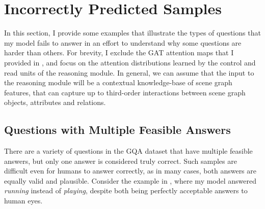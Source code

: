 \section{Incorrectly Predicted Samples}

In this section, I provide some examples that illustrate the types of questions that my model fails to answer in an effort to understand why some questions are harder than others. For brevity, I exclude the GAT attention maps that I provided in  \subsectionautorefname{ \ref{subsection:discussion_logical_sample}}, and focus on the attention distributions learned by the control and read units of the reasoning module. In general, we can assume that the input to the reasoning module will be a contextual knowledge-base of scene graph features, that can capture up to third-order interactions between scene graph objects, attributes and relations.

\subsection{Questions with Multiple Feasible Answers}

There are a variety of questions in the GQA dataset that have multiple feasible answers, but only one answer is considered truly correct. Such samples are difficult even for humans to answer correctly, as in many cases, both answers are equally valid and plausible. Consider the example in \figureautorefname{ \ref{fig:negative_ambiguous_sample}}, where my model answered \textit{running} instead of \textit{playing}, despite both being perfectly acceptable answers to human eyes.

